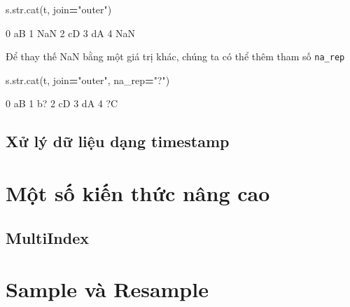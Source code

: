 \documentclass[
]{book}
\newenvironment{Shaded}{\begin{snugshade}}{\end{snugshade}}
\newcommand{\BuiltInTok}[1]{#1}
\newcommand{\NormalTok}[1]{#1}
\newcommand{\OperatorTok}[1]{\textcolor[rgb]{0.81,0.36,0.00}{\textbf{#1}}}
\newcommand{\StringTok}[1]{\textcolor[rgb]{0.31,0.60,0.02}{#1}}
\begin{document}
\begin{Shaded}
\begin{Highlighting}[]
\NormalTok{ s.}\BuiltInTok{str}\NormalTok{.cat(t, join}\OperatorTok{=}\StringTok{"outer"}\NormalTok{)}
\end{Highlighting}
\end{Shaded}

\begin{Shaded}
\begin{Highlighting}[]
\NormalTok{0    aB}
\NormalTok{1    NaN}
\NormalTok{2     cD}
\NormalTok{3    dA}
\NormalTok{4    NaN}
\end{Highlighting}
\end{Shaded}

Để thay thế NaN bằng một giá trị khác, chúng ta có thể thêm tham số \texttt{na\_rep}

\begin{Shaded}
\begin{Highlighting}[]
\NormalTok{s.}\BuiltInTok{str}\NormalTok{.cat(t, join}\OperatorTok{=}\StringTok{"outer"}\NormalTok{, na\_rep}\OperatorTok{=}\StringTok{"?"}\NormalTok{)}
\end{Highlighting}
\end{Shaded}

\begin{Shaded}
\begin{Highlighting}[]
\NormalTok{0    aB}
\NormalTok{1    b?}
\NormalTok{2    cD}
\NormalTok{3    dA}
\NormalTok{4    ?C}
\end{Highlighting}
\end{Shaded}

\section{Xử lý dữ liệu dạng timestamp}\label{xux1eed-luxfd-dux1eef-liux1ec7u-dux1ea1ng-timestamp}

\chapter{Một số kiến thức nâng cao}\label{mux1ed9t-sux1ed1-kiux1ebfn-thux1ee9c-nuxe2ng-cao}

\section{MultiIndex}\label{multiindex}

\chapter{Sample và Resample}\label{sample-vuxe0-resample}
\end{document}
